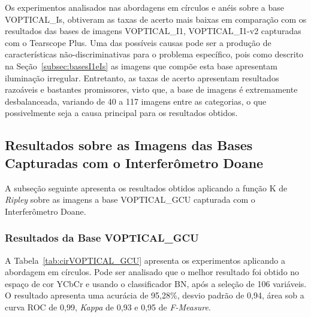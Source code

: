 Os experimentos analisados nas abordagens em círculos e anéis sobre a base VOPTICAL\_Is, obtiveram as taxas de acerto mais baixas em comparação com os resultados das bases de imagens VOPTICAL\_I1, VOPTICAL\_I1-v2 capturadas com o Tearscope Plus. Uma das possíveis causas pode ser a produção de características não-discriminativas para o problema específico, pois como descrito na Seção~\ref{subsec:basesI1eIs} as imagens que compõe esta base apresentam iluminação irregular. Entretanto, as taxas de acerto apresentam resultados razoáveis e bastantes promissores, visto que, a base de imagens é extremamente desbalanceada, variando de 40 a 117 imagens entre as categorias, o que possivelmente seja a causa principal para os resultados obtidos.

\subsection{Resultados sobre as Imagens das Bases Capturadas com o Interferômetro Doane}

A subseção seguinte apresenta os resultados obtidos aplicando a função K de \textit{Ripley} sobre as imagens a base VOPTICAL\_GCU capturada com o Interferômetro Doane.

\subsubsection{Resultados da Base VOPTICAL\_GCU}

A Tabela~\ref{tab:cirVOPTICAL_GCU} apresenta os experimentos aplicando a abordagem em círculos. Pode ser analisado que o melhor resultado foi obtido no espaço de cor YCbCr e usando o classificador BN, após a seleção de 106 variáveis. O resultado apresenta uma acurácia de 95,28\%, desvio padrão de 0,94, área sob a curva ROC de 0,99, \textit{Kappa} de 0,93 e 0,95 de \textit{F-Measure}.

